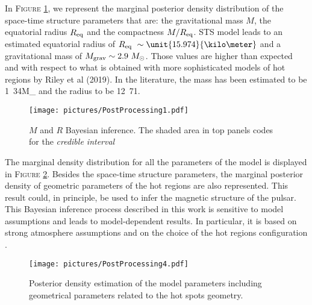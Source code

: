 \documentclass[a4paper, twoside, 12pt]{article}
\numberwithin{equation}{section}
\begin{document}
\hspace{\parindent}	 In F\textsc{igure} \ref{fig: SpaceStructureParameters}, we represent  the marginal posterior density distribution of the space-time structure parameters that are: the gravitational mass $M$, the equatorial radius $R_{\rm{eq}}$ and the compactness $M/R_{\rm{eq}}$. 
STS model leads to an estimated equatorial radius of $R_{\rm{eq}} ~ \sim \unit{15.974}{\kilo \meter}$ and a gravitational mass of $M_{\rm{grav}} \sim 2.9\ M_{\odot}$. Those values are higher than expected and with respect to what is obtained with more sophisticated models of hot regions by Riley et al (2019)\cite{Riley+19}.  In the literature, the mass has been estimated to be \unit{1.34}{M_{\odot}} and the radius to be \unit{12.71}{\kilo\meter}.\\


\begin{figure}
\texttt{[image: pictures/PostProcessing1.pdf]}
\caption[$M$ and $R$ inference]{$M$ and $R$ Bayesian inference. The shaded area in top panels codes for the {\itshape{credible interval}}}
\label{fig: SpaceStructureParameters}
\end{figure}


The marginal density distribution for all the parameters of the model is displayed in F\textsc{igure} \ref{fig: ModelParametersDistribution}. Besides the space-time structure parameters, the marginal posterior density of geometric parameters of the hot regions are also represented. This result could, in principle, be used to infer the magnetic structure of the pulsar. \\



This Bayesian inference process described in this work is sensitive to model assumptions and leads to model-dependent results. In particular, it is based on strong atmosphere assumptions \cite{Bogdanov+2007} and on the choice of the hot regions configuration \cite{Riley+19}. 
\begin{figure}
\texttt{[image: pictures/PostProcessing4.pdf]}
\caption[Posterior density estimation of the model parameters]{Posterior density estimation of the model parameters including geometrical parameters related to the hot spots geometry. }
\label{fig: ModelParametersDistribution}
\end{figure}


\end{document}
